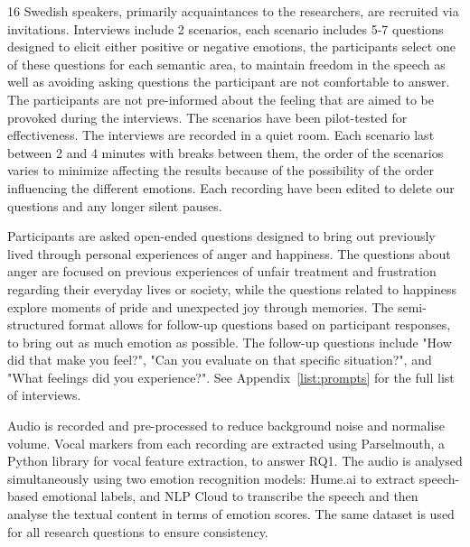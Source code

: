 16 Swedish speakers, primarily acquaintances to the researchers, are recruited via invitations. Interviews include 2 scenarios, 
each scenario includes 5-7 questions designed to elicit either positive or negative emotions, the participants select one of these questions for each semantic area, to maintain freedom in the speech as well as avoiding asking questions the participant are not comfortable to answer. The participants are not pre-informed about the feeling that are aimed to be provoked during the interviews. 
The scenarios have been pilot-tested for effectiveness. 
The interviews are recorded in a quiet room. Each scenario last between 2 and 4 minutes with breaks between them, the order of the scenarios varies to minimize affecting the results because of the possibility of the order influencing the different emotions. Each recording have been edited to delete our questions and any longer silent pauses. 

Participants are asked open-ended questions designed to bring out previously lived through personal experiences of anger and happiness. The questions about anger are focused on previous experiences of unfair treatment and frustration regarding their everyday lives or society, while the questions related to happiness explore moments of pride and unexpected joy through memories. 
The semi-structured format allows for follow-up questions based on participant responses, to bring out as much emotion as possible. The follow-up questions include "How did that make you feel?", "Can you evaluate on that specific situation?", and "What feelings did you experience?". See Appendix~\ref{list:prompts} for the full list of interviews. 

Audio is recorded and pre-processed to reduce background noise and normalise volume. Vocal markers from each recording are extracted using Parselmouth, a Python library for vocal feature extraction, to answer RQ1. The audio is analysed simultaneously using two emotion recognition models: Hume.ai to extract speech-based emotional labels, and NLP Cloud to transcribe the speech and then analyse the textual content in terms of emotion scores. The same dataset is used for all research questions to ensure consistency. 

